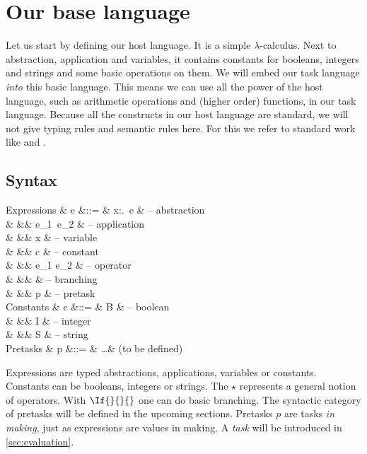 
\section{Our base language}

Let us start by defining our host language.
It is a simple $\lambda$-calculus.
Next to abstraction, application and variables,
it contains constants for booleans, integers and strings
and some basic operations on them.
We will embed our task language \emph{into} this basic language.
This means we can use all the power of the host language,
such as arithmetic operations and (higher order) functions,
in our task language.
Because all the constructs in our host language are standard,
we will not give typing rules and semantic rules here.
For this we refer to standard work like \textcite{books/Pierce02TAPL} and \textcite{books/Harper16PFPL}.


\subsection{Syntax}
\label{sec:syntax}

\begin{grammar}
  Expressions
    & e &::= & \lambda x:\tau.\ e & – abstraction \\
    &   &\mid& e_1\ e_2           & – application \\
    &   &\mid& x                  & – variable \\
    &   &\mid& c                  & – constant \\
    &   &\mid& e_1 \star e_2      & – operator \\
    &   &\mid&  & – branching \\
    &   &\mid& p                  & – pretask \\
  Constants
    & c &::= & B                  & – boolean \\
    &   &\mid& I                  & – integer \\
    &   &\mid& S                  & – string \\
  Pretasks
    & p &::= & \ldots             & (to be defined) \\
\end{grammar}
Expressions are typed abstractions, applications, variables or constants.
Constants can be booleans, integers or strings.
The $\star$ represents a general notion of operators.
With $\If{}{}{}$ one can do basic branching.
The syntactic category of pretasks will be defined in the upcoming sections.
Pretasks $p$ are tasks \emph{in making},
just as expressions are values in making.
A \emph{task} will be introduced in \autoref{sec:evaluation}.

